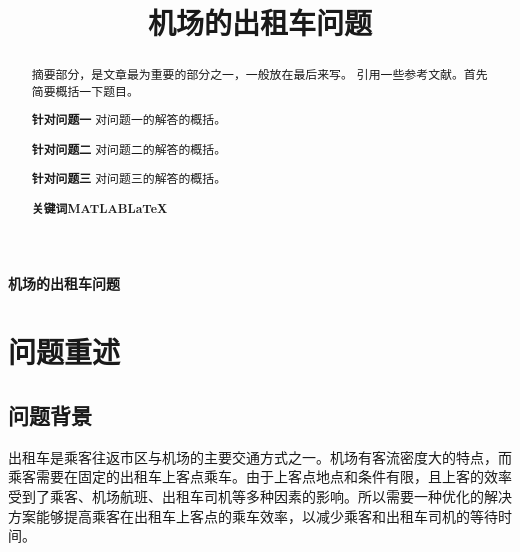 \documentclass{cumcm}
\title{机场的出租车问题}
\begin{document}
 

\begin{minipage}{0.9\textwidth}
\centering\LARGE\textbf{机场的出租车问题}
\end{minipage}

\begin{abstract}
	摘要部分，是文章最为重要的部分之一，一般放在最后来写。
	引用一些参考文献\cite{citetest}。首先简要概括一下题目。\par
	\textbf{针对问题一}\quad
	对问题一的解答的概括。\par
	\textbf{针对问题二}\quad
	对问题二的解答的概括。\par
	\textbf{针对问题三}\quad
	对问题三的解答的概括。
\\\par
\textbf{关键词\quad MATLAB\quad \LaTeX}
\end{abstract}

\newpage
\section{问题重述}
\subsection{问题背景}
出租车是乘客往返市区与机场的主要交通方式之一。机场有客流密度大的特点，而乘客需要在固定的出租车上客点乘车。由于上客点地点和条件有限，且上客的效率受到了乘客、机场航班、出租车司机等多种因素的影响。所以需要一种优化的解决方案能够提高乘客在出租车上客点的乘车效率，以减少乘客和出租车司机的等待时间。
\end{document}
